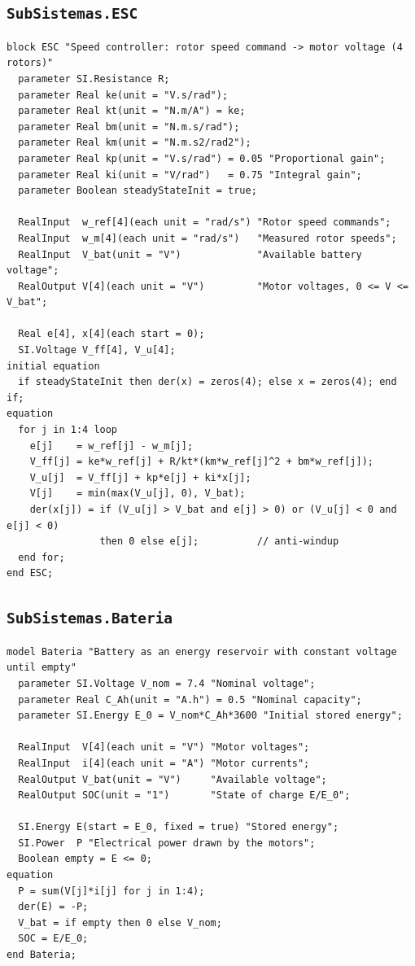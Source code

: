 \subsection{\texttt{SubSistemas.ESC}}
\begin{lstlisting}
block ESC "Speed controller: rotor speed command -> motor voltage (4 rotors)"
  parameter SI.Resistance R;
  parameter Real ke(unit = "V.s/rad");
  parameter Real kt(unit = "N.m/A") = ke;
  parameter Real bm(unit = "N.m.s/rad");
  parameter Real km(unit = "N.m.s2/rad2");
  parameter Real kp(unit = "V.s/rad") = 0.05 "Proportional gain";
  parameter Real ki(unit = "V/rad")   = 0.75 "Integral gain";
  parameter Boolean steadyStateInit = true;

  RealInput  w_ref[4](each unit = "rad/s") "Rotor speed commands";
  RealInput  w_m[4](each unit = "rad/s")   "Measured rotor speeds";
  RealInput  V_bat(unit = "V")             "Available battery voltage";
  RealOutput V[4](each unit = "V")         "Motor voltages, 0 <= V <= V_bat";

  Real e[4], x[4](each start = 0);
  SI.Voltage V_ff[4], V_u[4];
initial equation
  if steadyStateInit then der(x) = zeros(4); else x = zeros(4); end if;
equation
  for j in 1:4 loop
    e[j]    = w_ref[j] - w_m[j];
    V_ff[j] = ke*w_ref[j] + R/kt*(km*w_ref[j]^2 + bm*w_ref[j]);
    V_u[j]  = V_ff[j] + kp*e[j] + ki*x[j];
    V[j]    = min(max(V_u[j], 0), V_bat);
    der(x[j]) = if (V_u[j] > V_bat and e[j] > 0) or (V_u[j] < 0 and e[j] < 0)
                then 0 else e[j];          // anti-windup
  end for;
end ESC;
\end{lstlisting}

\subsection{\texttt{SubSistemas.Bateria}}
\begin{lstlisting}
model Bateria "Battery as an energy reservoir with constant voltage until empty"
  parameter SI.Voltage V_nom = 7.4 "Nominal voltage";
  parameter Real C_Ah(unit = "A.h") = 0.5 "Nominal capacity";
  parameter SI.Energy E_0 = V_nom*C_Ah*3600 "Initial stored energy";

  RealInput  V[4](each unit = "V") "Motor voltages";
  RealInput  i[4](each unit = "A") "Motor currents";
  RealOutput V_bat(unit = "V")     "Available voltage";
  RealOutput SOC(unit = "1")       "State of charge E/E_0";

  SI.Energy E(start = E_0, fixed = true) "Stored energy";
  SI.Power  P "Electrical power drawn by the motors";
  Boolean empty = E <= 0;
equation
  P = sum(V[j]*i[j] for j in 1:4);
  der(E) = -P;
  V_bat = if empty then 0 else V_nom;
  SOC = E/E_0;
end Bateria;
\end{lstlisting}

